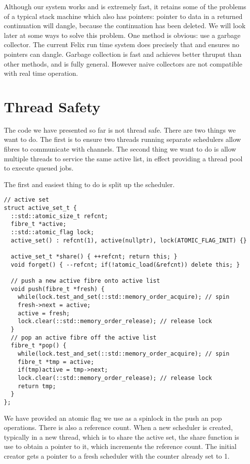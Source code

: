 \documentclass[oneside]{book}
\begin{document}
Although our system works and is extremely fast, it retains some of the problems
of a typical stack machine which also has pointers: pointer to data in a returned
continuation will dangle, because the continuation has been deleted. We will look later
at some ways to solve this problem. One method is obvious: use a garbage collector.
The current Felix run time system does precisely that and ensures no pointers
can dangle. Garbage collection is fast and achieves better thruput than other methods,
and is fully general. However naive collectors are not compatible with real time
operation.

\section{Thread Safety}
The code we have presented so far is not thread safe. There are two things we want
to do. The first is to ensure two threads running separate schedulers allow
fibres to communicate with channels. The second thing we want to do is allow
multiple threads to service the same active list, in effect providing a thread
pool to execute queued jobs.

The first and easiest thing to do is split up the scheduler.

\begin{verbatim}
// active set
struct active_set_t {
  ::std::atomic_size_t refcnt;
  fibre_t *active;
  ::std::atomic_flag lock;
  active_set() : refcnt(1), active(nullptr), lock(ATOMIC_FLAG_INIT) {}

  active_set_t *share() { ++refcnt; return this; }
  void forget() { --refcnt; if(!atomic_load(&refcnt)) delete this; }

  // push a new active fibre onto active list
  void push(fibre_t *fresh) { 
    while(lock.test_and_set(::std::memory_order_acquire); // spin
    fresh->next = active; 
    active = fresh; 
    lock.clear(::std::memory_order_release); // release lock
  }
  // pop an active fibre off the active list
  fibre_t *pop() {
    while(lock.test_and_set(::std::memory_order_acquire); // spin
    fibre_t *tmp = active;
    if(tmp)active = tmp->next;
    lock.clear(::std::memory_order_release); // release lock
    return tmp;
  }
};
\end{verbatim}

We have provided an atomic flag we use as a spinlock in the push an pop operations.
There is also a reference count. When a new scheduler is created, typically in a new
thread, which is to share the active set, the share function is use to obtain a pointer
to it, which increments the reference count. The initial creator gets a pointer
to a fresh scheduler with the counter already set to 1.
\end{document}
